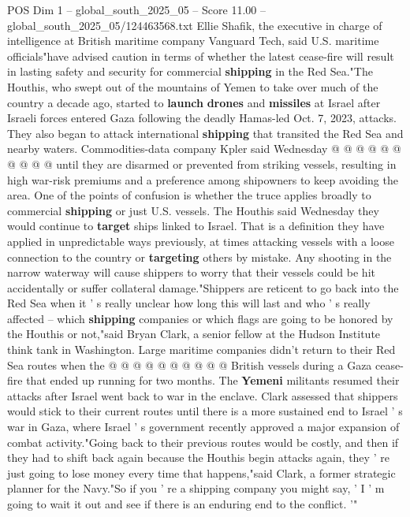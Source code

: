 \begin{textsample}{POS Dim 1 – global\_south\_2025\_05 – Score 11.00 – global\_south\_2025\_05/124463568.txt}
Ellie Shafik, the executive in charge of intelligence at British maritime company Vanguard Tech, said U.S. maritime officials"have advised caution in terms of whether the latest cease-fire will result in lasting safety and security for commercial \textbf{shipping} in the Red Sea."The Houthis, who swept out of the mountains of Yemen to take over much of the country a decade ago, started to \textbf{launch} \textbf{drones} and \textbf{missiles} at Israel after Israeli forces entered Gaza following the deadly Hamas-led Oct. 7, 2023, attacks.
They also began to attack international \textbf{shipping} that transited the Red Sea and nearby waters.
Commodities-data company Kpler said Wednesday @ @ @ @ @ @ @ @ @ @ until they are disarmed or prevented from striking vessels, resulting in high war-risk premiums and a preference among shipowners to keep avoiding the area.
One of the points of confusion is whether the truce applies broadly to commercial \textbf{shipping} or just U.S. vessels.
The Houthis said Wednesday they would continue to \textbf{target} ships linked to Israel.
That is a definition they have applied in unpredictable ways previously, at times attacking vessels with a loose connection to the country or \textbf{targeting} others by mistake.
Any shooting in the narrow waterway will cause shippers to worry that their vessels could be hit accidentally or suffer collateral damage."Shippers are reticent to go back into the Red Sea when it ' s really unclear how long this will last and who ' s really affected -- which \textbf{shipping} companies or which flags are going to be honored by the Houthis or not,"said Bryan Clark, a senior fellow at the Hudson Institute think tank in Washington.
Large maritime companies didn't return to their Red Sea routes when the @ @ @ @ @ @ @ @ @ @ British vessels during a Gaza cease-fire that ended up running for two months.
The \textbf{Yemeni} militants resumed their attacks after Israel went back to war in the enclave.
Clark assessed that shippers would stick to their current routes until there is a more sustained end to Israel ' s war in Gaza, where Israel ' s government recently approved a major expansion of combat activity."Going back to their previous routes would be costly, and then if they had to shift back again because the Houthis begin attacks again, they ' re just going to lose money every time that happens,"said Clark, a former strategic planner for the Navy."So if you ' re a shipping company you might say, ' I ' m going to wait it out and see if there is an enduring end to the conflict. '"

\end{textsample}
